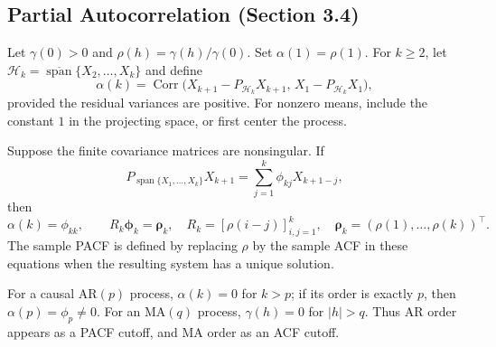 \subsection{Partial Autocorrelation (Section 3.4)}
\begin{definition}
Let $\gamma(0)>0$ and $\rho(h)=\gamma(h)/\gamma(0)$.
Set $\alpha(1)=\rho(1)$. For $k\ge2$, let
$\mathcal H_k=\overline{\operatorname{span}}\{X_2,\ldots,X_k\}$ and define
\[
\alpha(k)=\operatorname{Corr}\bigl(
X_{k+1}-P_{\mathcal H_k}X_{k+1},\,
X_1-P_{\mathcal H_k}X_1\bigr),
\]
provided the residual variances are positive. For nonzero means, include the
constant $1$ in the projecting space, or first center the process.
\end{definition}
\begin{proposition}
Suppose the finite covariance matrices are nonsingular. If
\[
P_{\operatorname{span}\{X_1,\ldots,X_k\}}X_{k+1}
=\sum_{j=1}^{k}\phi_{kj}X_{k+1-j},
\]
then
\[
\alpha(k)=\phi_{kk},\qquad
R_k\boldsymbol\phi_k=\boldsymbol\rho_k,
\quad R_k=[\rho(i-j)]_{i,j=1}^k,
\quad\boldsymbol\rho_k=(\rho(1),\ldots,\rho(k))^\top.
\]
The sample PACF is defined by replacing $\rho$ by the sample ACF in these
equations when the resulting system has a unique solution.
\end{proposition}
\begin{proposition}
For a causal AR$(p)$ process, $\alpha(k)=0$ for $k>p$; if its order is
exactly $p$, then $\alpha(p)=\phi_p\ne0$.
For an MA$(q)$ process, $\gamma(h)=0$ for $|h|>q$.
Thus AR order appears as a PACF cutoff, and MA order as an ACF cutoff.
\end{proposition}

